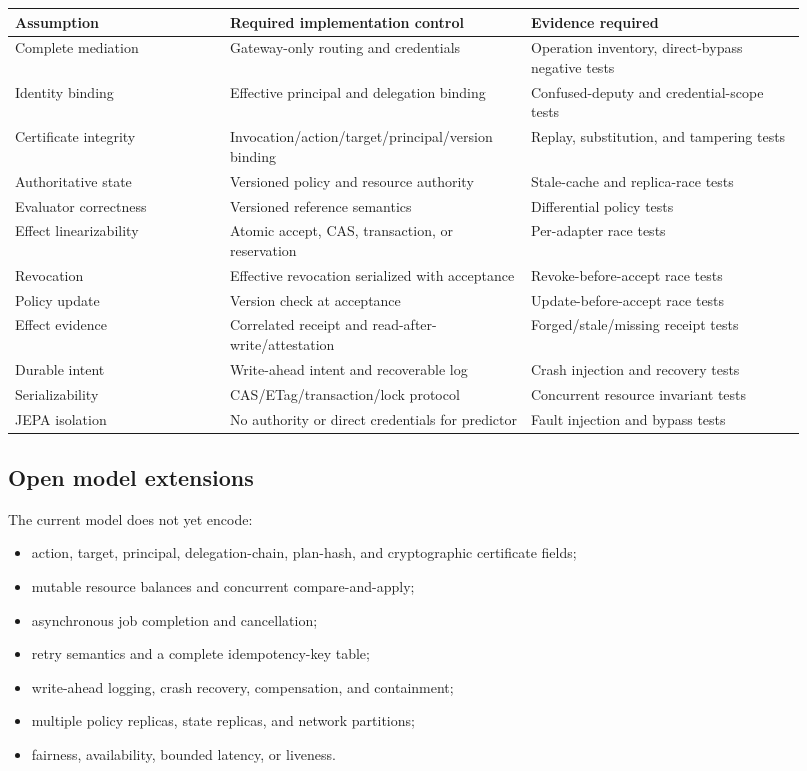 \documentclass[11pt,a4paper]{article}
\theoremstyle{remark}
\begin{document}
\begin{longtable}{p{0.25\linewidth}p{0.35\linewidth}p{0.32\linewidth}}
\toprule
Assumption & Required implementation control & Evidence required\\
\midrule
Complete mediation & Gateway-only routing and credentials & Operation inventory, direct-bypass negative tests\\
Identity binding & Effective principal and delegation binding & Confused-deputy and credential-scope tests\\
Certificate integrity & Invocation/action/target/principal/version binding & Replay, substitution, and tampering tests\\
Authoritative state & Versioned policy and resource authority & Stale-cache and replica-race tests\\
Evaluator correctness & Versioned reference semantics & Differential policy tests\\
Effect linearizability & Atomic accept, CAS, transaction, or reservation & Per-adapter race tests\\
Revocation & Effective revocation serialized with acceptance & Revoke-before-accept race tests\\
Policy update & Version check at acceptance & Update-before-accept race tests\\
Effect evidence & Correlated receipt and read-after-write/attestation & Forged/stale/missing receipt tests\\
Durable intent & Write-ahead intent and recoverable log & Crash injection and recovery tests\\
Serializability & CAS/ETag/transaction/lock protocol & Concurrent resource invariant tests\\
JEPA isolation & No authority or direct credentials for predictor & Fault injection and bypass tests\\
\bottomrule
\end{longtable}

\subsection{Open model extensions}

The current model does not yet encode:
\begin{itemize}[leftmargin=2em]
\item action, target, principal, delegation-chain, plan-hash, and cryptographic certificate fields;
\item mutable resource balances and concurrent compare-and-apply;
\item asynchronous job completion and cancellation;
\item retry semantics and a complete idempotency-key table;
\item write-ahead logging, crash recovery, compensation, and containment;
\item multiple policy replicas, state replicas, and network partitions;
\item fairness, availability, bounded latency, or liveness.
\end{itemize}
\end{document}
